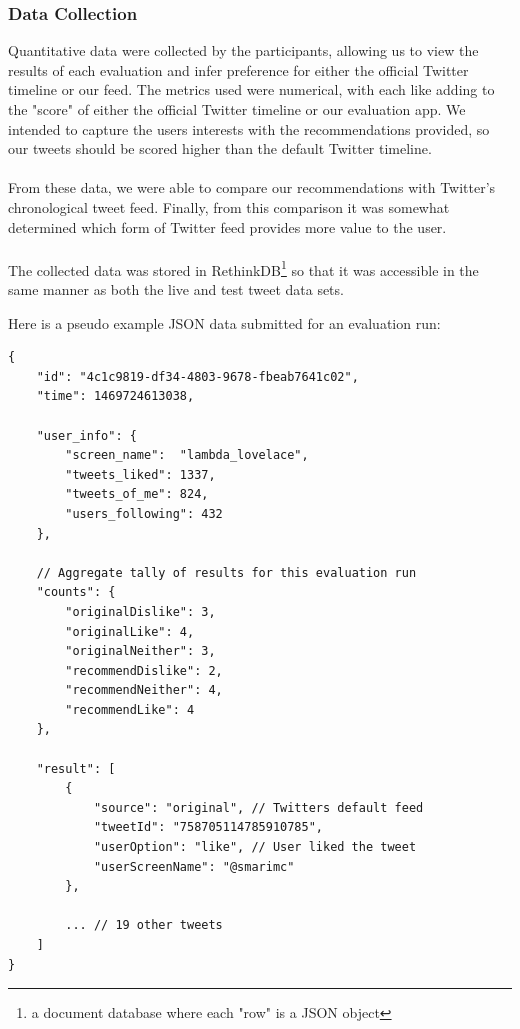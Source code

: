 \documentclass{article}
\begin{document}
\subsubsection*{Data Collection} %
Quantitative data were collected by the participants, allowing us to view the results of each evaluation and infer preference for either the official Twitter timeline or our feed. The metrics used were numerical, with each like adding to the "score" of either the official Twitter timeline or our evaluation app. We intended to capture the users interests with the recommendations provided, so our tweets should be scored higher than the default Twitter timeline.
\\\\
From these data, we were able to compare our recommendations with Twitter's chronological tweet feed. Finally, from this comparison it was somewhat determined which form of Twitter feed provides more value to the user. 
\\\\
The collected data was stored in RethinkDB\footnote{a document database where each "row" is a JSON object} so that it was accessible in the same manner as both the live and test tweet data sets.

\begin{samepage}
\noindent Here is a pseudo example JSON data submitted for an evaluation run:
\begin{verbatim}
{
    "id": "4c1c9819-df34-4803-9678-fbeab7641c02",
    "time": 1469724613038,
    
    "user_info": {
        "screen_name":  "lambda_lovelace",
        "tweets_liked": 1337,
        "tweets_of_me": 824,
        "users_following": 432
    },

    // Aggregate tally of results for this evaluation run
    "counts": {
        "originalDislike": 3,
        "originalLike": 4,
        "originalNeither": 3,
        "recommendDislike": 2,
        "recommendNeither": 4,
        "recommendLike": 4
    },
    
    "result": [
        {
            "source": "original", // Twitters default feed
            "tweetId": "758705114785910785",
            "userOption": "like", // User liked the tweet
            "userScreenName": "@smarimc"
        },
        
        ... // 19 other tweets
    ]
}
\end{verbatim}
\end{samepage}
\end{document}
